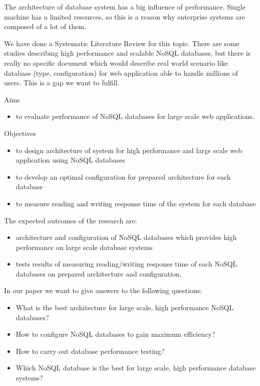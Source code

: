 \documentclass[times, 10pt,twocolumn]{article}
\begin{document}
The architecture of database system has a big influence of performance. Single machine has a limited
resources, so this is a reason why enterprise systems are composed of a lot of them.

We have done a Systematic Literature Review for this topic. There are some studies describing high performance 
and scalable NoSQL databases, but there is really no specific document which would describe real world scenario like 
database (type, configuration) for web application able to handle millions of users. This is a gap we want to fulfill.


Aims
\begin{itemize}
	\item to evaluate performance of NoSQL databases for large scale web applications.
\end{itemize}

Objectives
\begin{itemize}
	\item to design architecture of system for high performance and large scale web application using NoSQL databases
	\item to develop an optimal configuration for prepared architecture for each database
	\item to measure reading and writing response time of the system for each database
\end{itemize}



The expected outcomes of the research are:

\begin{itemize}
  \item architecture and configuration of NoSQL databases which provides high performance on large scale database systems
  \item tests results of measuring reading/writing response time of each NoSQL databases on prepared architecture and configuration.
\end{itemize}


In our paper we want to give answers to the following questions:

\begin{itemize}
  \item What is the best architecture for large scale, high performance NoSQL databases?
  \item How to configure NoSQL databases to gain maximum efficiency?
  \item How to carry out database performance testing?
  \item Which NoSQL database is the best for large scale, high performance database systems?
\end{itemize}
 
\end{document}
